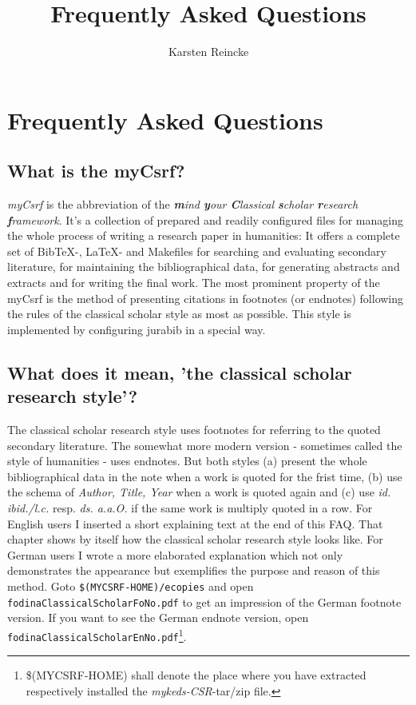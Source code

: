 \documentclass[
  DIV=calc,
  BCOR=5mm,
  11pt,
  headings=small,
  oneside,
  abstract=true,
  toc=bib,
  ngerman,english]{scrartcl}
\begin{document}
\nocite{*}

\titlehead{myCsrf-: the Classical Scholar Research
Framework} \subject{Humanities Made With \textit{LaTeX}, \textit{BibTeX} and
\textit{jurabib}}
\title{Frequently Asked Questions}
\author{Karsten Reincke}

\maketitle

\footnotesize
\tableofcontents

\normalsize

\section{Frequently Asked Questions }
\subsection{What is the myCsrf?}
\emph{myCsrf} is the abbreviation of the \textit{\textbf{m}ind \textbf{y}our
\textbf{C}lassical \textbf{s}cholar \textbf{r}esearch \textbf{f}ramework}. It's
a collection of prepared and readily configured files for managing the whole
process of writing a research paper in humanities: It offers a complete set of
BibTeX-, LaTeX- and Makefiles for searching and evaluating secondary literature,
for maintaining the bibliographical data, for generating abstracts and extracts
and for writing the final work. The most prominent property of the
myCsrf is the method of presenting citations in footnotes (or
endnotes) following the rules of the classical scholar style as most as
possible. This style is implemented by configuring jurabib in a special way.

\subsection{What does it mean, 'the classical scholar research style'?}
The classical scholar research style uses footnotes for referring to the quoted
secondary literature. The somewhat more modern version - sometimes called the
style of humanities - uses endnotes. But both styles (a) present the whole
bibliographical data in the note when a work is quoted for the frist time, (b)
use the schema of \textit{Author, Title, Year} when a work is quoted again and
(c) use \textit{id. ibid./l.c.} resp. \textit{ds. a.a.O.} if the same work is
multiply quoted in a row. For English users I inserted a short explaining text
at the end of this FAQ. That chapter shows by itself how the classical scholar
research style looks like. For German users I wrote a more elaborated
explanation which not only demonstrates the appearance but exemplifies the
purpose and reason of this method. Goto \texttt{\$(MYCSRF-HOME)/ecopies}
and open \texttt{fodinaClassicalScholarFoNo.pdf} to get an impression of the
German footnote version. If you want to see the German endnote version, open
\texttt{fodinaClassicalScholarEnNo.pdf}\footnote{\$(MYCSRF-HOME) shall
denote the place where you have extracted respectively installed the
\textit{my\-keds\--CSR}-tar/zip file.}.
\end{document}
